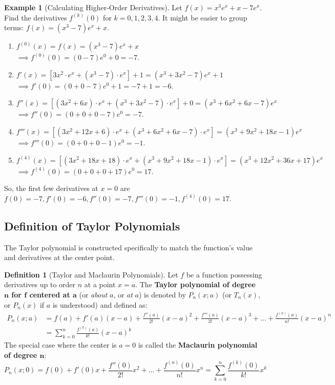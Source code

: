 \documentclass[11pt, a4paper]{article}
\theoremstyle{plain} %
\theoremstyle{definition} %
\newtheorem{definition}[theorem]{Definition}
\newtheorem{example}[theorem]{Example}
\begin{document}
\begin{example}[Calculating Higher-Order Derivatives]\label{ex:higher_deriv_calc}
Let $f(x) = x^3 e^x + x - 7e^x$. Find the derivatives $f^{(k)}(0)$ for $k=0, 1, 2, 3, 4$.
It might be easier to group terms: $f(x) = (x^3-7)e^x + x$.
\begin{enumerate}
    \item $f^{(0)}(x) = f(x) = (x^3-7)e^x + x$
          $\implies f^{(0)}(0) = (0-7)e^0 + 0 = -7$.
    \item $f'(x) = [3x^2 \cdot e^x + (x^3-7) \cdot e^x] + 1 = (x^3+3x^2-7)e^x + 1$
          $\implies f'(0) = (0+0-7)e^0 + 1 = -7 + 1 = -6$.
    \item $f''(x) = [(3x^2+6x) \cdot e^x + (x^3+3x^2-7) \cdot e^x] + 0 = (x^3+6x^2+6x-7)e^x$
          $\implies f''(0) = (0+0+0-7)e^0 = -7$.
    \item $f'''(x) = [(3x^2+12x+6) \cdot e^x + (x^3+6x^2+6x-7) \cdot e^x] = (x^3+9x^2+18x-1)e^x$
          $\implies f'''(0) = (0+0+0-1)e^0 = -1$.
    \item $f^{(4)}(x) = [(3x^2+18x+18) \cdot e^x + (x^3+9x^2+18x-1) \cdot e^x] = (x^3+12x^2+36x+17)e^x$
          $\implies f^{(4)}(0) = (0+0+0+17)e^0 = 17$.
\end{enumerate}
So, the first few derivatives at $x=0$ are $f(0)=-7, f'(0)=-6, f''(0)=-7, f'''(0)=-1, f^{(4)}(0)=17$.
\end{example}


\subsection{Definition of Taylor Polynomials}
The Taylor polynomial is constructed specifically to match the function's value and derivatives at the center point.

\begin{definition}[Taylor and Maclaurin Polynomials]\label{def:taylor_poly}
Let $f$ be a function possessing derivatives up to order $n$ at a point $x=a$. The \textbf{Taylor polynomial of degree $\boldsymbol{n}$ for $\boldsymbol{f}$ centered at $\boldsymbol{a}$} (or \textit{about} $a$, or \textit{at} $a$) is denoted by $P_n(x;a)$ (or $T_n(x)$, or $P_n(x)$ if $a$ is understood) and defined as:
\begin{align*}
P_n(x;a) &= f(a) + f'(a)(x-a) + \frac{f''(a)}{2!}(x-a)^2 + \frac{f'''(a)}{3!}(x-a)^3 + \dots + \frac{f^{(n)}(a)}{n!}(x-a)^n \\
         &= \sum_{k=0}^{n} \frac{f^{(k)}(a)}{k!}(x-a)^k
\end{align*}
The special case where the center is $a=0$ is called the \textbf{Maclaurin polynomial of degree $\boldsymbol{n}$}:
$$ P_n(x;0) = f(0) + f'(0)x + \frac{f''(0)}{2!}x^2 + \dots + \frac{f^{(n)}(0)}{n!}x^n = \sum_{k=0}^{n} \frac{f^{(k)}(0)}{k!}x^k $$
\end{definition}
\end{document}
